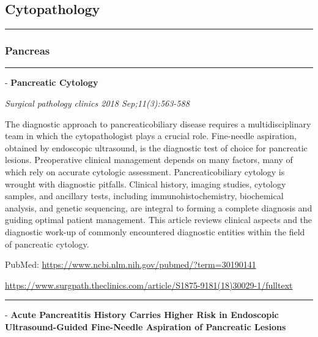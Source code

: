 \documentclass[]{article}
\begin{document}
\hypertarget{cytopathology}{%
\subsection{Cytopathology}\label{cytopathology}}

\begin{center}\rule{0.5\linewidth}{\linethickness}\end{center}

\hypertarget{pancreas-1}{%
\subsubsection{Pancreas}\label{pancreas-1}}

\begin{center}\rule{0.5\linewidth}{\linethickness}\end{center}

 - \textbf{Pancreatic Cytology}

\emph{Surgical pathology clinics 2018 Sep;11(3):563-588}

The diagnostic approach to pancreaticobiliary disease requires a
multidisciplinary team in which the cytopathologist plays a crucial
role. Fine-needle aspiration, obtained by endoscopic ultrasound, is the
diagnostic test of choice for pancreatic lesions. Preoperative clinical
management depends on many factors, many of which rely on accurate
cytologic assessment. Pancreaticobiliary cytology is wrought with
diagnostic pitfalls. Clinical history, imaging studies, cytology
samples, and ancillary tests, including immunohistochemistry,
biochemical analysis, and genetic sequencing, are integral to forming a
complete diagnosis and guiding optimal patient management. This article
reviews clinical aspects and the diagnostic work-up of commonly
encountered diagnostic entities within the field of pancreatic cytology.

PubMed: \url{https://www.ncbi.nlm.nih.gov/pubmed/?term=30190141}

{}

{}

\url{https://www.surgpath.theclinics.com/article/S1875-9181(18)30029-1/fulltext}

\begin{center}\rule{0.5\linewidth}{\linethickness}\end{center}

 - \textbf{Acute Pancreatitis History Carries Higher Risk in Endoscopic
Ultrasound-Guided Fine-Needle Aspiration of Pancreatic Lesions}
\end{document}
